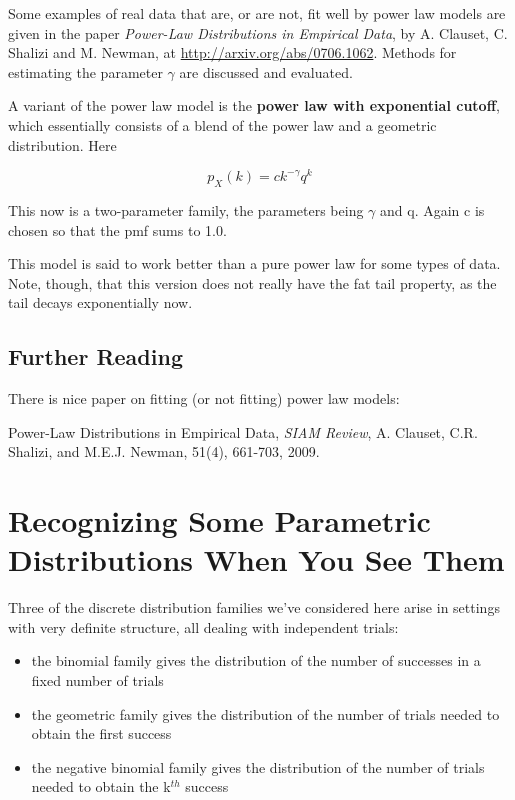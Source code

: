 Some examples of real data that are, or are not, fit well by power law
models are given in the paper {\it Power-Law Distributions in Empirical
Data}, by A. Clauset, C. Shalizi and M. Newman, at
\url{http://arxiv.org/abs/0706.1062}.  Methods for estimating the
parameter $\gamma$ are discussed and evaluated.

A variant of the power law model is the {\bf power law with exponential
cutoff}, which essentially consists of a blend of the power law and a
geometric distribution.  Here

\begin{equation}
p_X(k) = c k^{-\gamma} q^k
\end{equation}

This now is a two-parameter family, the parameters being $\gamma$ and q.
Again c is chosen so that the pmf sums to 1.0.

This model is said to work better than a pure power law for some types
of data.  Note, though, that this version does not really have the fat
tail property, as the tail decays exponentially now.

\subsection{Further Reading}

There is nice paper on fitting (or not fitting) power law models:

Power-Law Distributions in Empirical Data, {\it SIAM Review}, A.
Clauset, C.R. Shalizi, and M.E.J. Newman, 51(4), 661-703, 2009.

\section{Recognizing Some Parametric Distributions When You See Them}

Three of the discrete distribution families we've considered here arise
in settings with very definite structure, all dealing with independent
trials:

\begin{itemize}

\item the binomial family gives the distribution of the number of
successes in a fixed number of trials

\item the geometric family gives the distribution of the number of
trials needed to obtain the first success

\item the negative binomial family gives the distribution of the number of
trials needed to obtain the k$^{th}$ success

\end{itemize}

